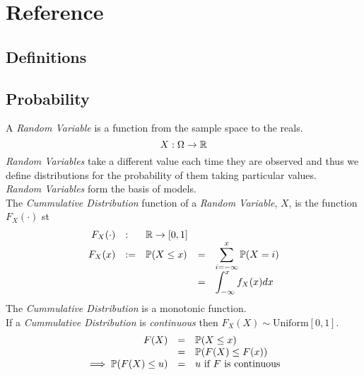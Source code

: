 \documentclass[11pt,a4paper]{article}
\begin{document}
\newpage
\setcounter{section}{-1}
\section{Reference}

\subsection{Definitions}







\subsection{Probability}

A \textit{Random Variable} is a function from the sample space to the reals.
$$X:\Omega\to\mathbb{R}$$
\textit{Random Variables} take a different value each time they are observed and thus we define distributions for the probability of them taking particular values.\\
\textit{Random Variables} form the basis of models.\\

The \textit{Cummulative Distribution} function of a \textit{Random Variable}, $X$, is the function $F_X(\cdot)$ st
\[\begin{array}{rllrl}
F_X(\cdot)&:&\mathbb{R}\to[0,1]\\
F_X(x)&:=&\mathbb{P}(X\leq x)&=&\displaystyle\sum_{i=-\infty}^x\mathbb{P}(X=i)\\
&&&=&\displaystyle\int_{-\infty}^xf_X(x)dx
\end{array}\]
The \textit{Cummulative Distribution} is a monotonic function.\\

If a \textit{Cummulative Distribution} is \textit{continuous} then $F_X(X)\sim\text{Uniform}[0,1]$.\\

\[\begin{array}{rcl}
F(X)&=&\mathbb{P}(X\leq x)\\
&=&\mathbb{P}(F(X)\leq F(x))\\
\implies\mathbb{P}(F(X)\leq u)&=&u\text{ if $F$ is continuous}
\end{array}\]
\end{document}
